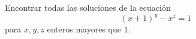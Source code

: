 Encontrar todas las soluciones de la ecuación
\[ (x+1)^y - x^z = 1 \]
para $x,y,z$ enteros mayores que $1$.
